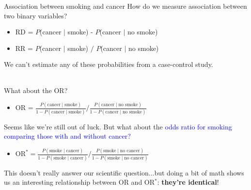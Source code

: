 \documentclass[10pt,t]{beamer}
\begin{document}
\begin{frame}{Association between smoking and cancer}
	\vspace{-0.5cm}
	How do we measure association between two binary variables? \pause
	\begin{itemize}
		\item RD = $P$(cancer $\mid$ smoke) -  $P$(cancer $\mid$ no smoke)\pause
		\item RR = $P$(cancer $\mid$ smoke) $/$ $P$(cancer $\mid$ no smoke)
	\end{itemize}
	We can't estimate any of these probabilities from a case-control study. \pause
	\\ ~\
	
	What about the OR?
	\begin{itemize}
		\item OR = $\frac{P(\text{cancer} \mid \text{smoke})}{1 - P(\text{cancer} \mid \text{smoke})} / \frac{P(\text{cancer} \mid \text{no smoke})}{1 - P(\text{cancer} \mid \text{no smoke})}$
	\end{itemize}
	\vspace{0.2cm}\pause
	Seems like we're still out of luck. But what about the \textcolor{blue}{odds ratio for smoking comparing those with and without cancer?}
	\begin{itemize}
		\item $\text{OR}^* = \frac{P(\text{smoke} \mid \text{cancer})}{1 - P(\text{smoke} \mid \text{cancer})} / \frac{P(\text{smoke} \mid \text{no cancer})}{1 - P(\text{smoke} \mid \text{no cancer})}$
	\end{itemize}
	\vspace{0.2cm}\pause
	This doesn't really answer our scientific question...but doing a bit of math shows us an interesting relationship between OR and OR$^*$: \textbf{they're identical}!
\end{frame}
\end{document}
